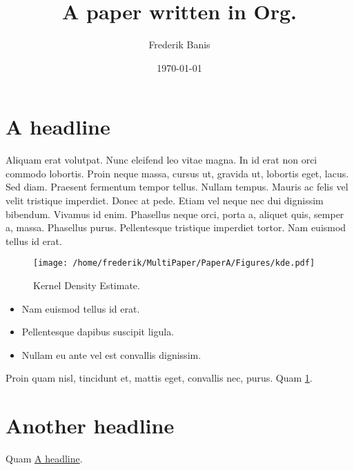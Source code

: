 \documentclass[11pt]{article}
\author{Frederik Banis}
\date{\today}
\title{A paper written in Org.}
\begin{document}
\maketitle
\tableofcontents

\section{A headline}
\label{sec:orgd7f214b}
Aliquam erat volutpat.  Nunc eleifend leo vitae magna.  In id erat non orci commodo lobortis.  Proin neque massa, cursus ut, gravida ut, lobortis eget, lacus.  Sed diam.  Praesent fermentum tempor tellus.  Nullam tempus.  Mauris ac felis vel velit tristique imperdiet.  Donec at pede.  Etiam vel neque nec dui dignissim bibendum.  Vivamus id enim.  Phasellus neque orci, porta a, aliquet quis, semper a, massa.  Phasellus purus.  Pellentesque tristique imperdiet tortor.  Nam euismod tellus id erat.

\begin{figure}[htbp]
\centering
\texttt{[image: /home/frederik/MultiPaper/PaperA/Figures/kde.pdf]}
\caption[KDE plot]{\label{fig_kde}
Kernel Density Estimate.}
\end{figure}

\begin{itemize}
\item Nam euismod tellus id erat.
\item Pellentesque dapibus suscipit ligula.
\item Nullam eu ante vel est convallis dignissim.
\end{itemize}

Proin quam nisl, tincidunt et, mattis eget, convallis nec, purus.  Quam \ref{fig_kde}.
\section{Another headline}
\label{sec:orgfdc4100}

Quam \hyperref[sec:orgd7f214b]{A headline}.
\end{document}

